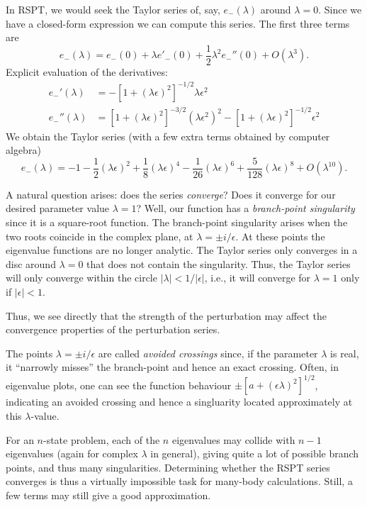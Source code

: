 \documentclass{report}
\theoremstyle{plain}
\theoremstyle{definition}
\begin{document}
In RSPT, we would seek the Taylor series of, say, $e_-(\lambda)$
around $\lambda=0$. Since we have a closed-form expression we can
compute this series. The first three terms are
\begin{equation}
  e_-(\lambda) = e_-(0) + \lambda e'_-(0) + \frac{1}{2}\lambda^2 e_-''(0)
  + O(\lambda^3).
\end{equation}
Explicit evaluation of the derivatives:
\begin{align}
  e_-'(\lambda) &= -[1 + (\lambda\epsilon)^2]^{-1/2} \lambda\epsilon^2 \\
  e_-''(\lambda) &= [1 + (\lambda\epsilon)^2]^{-3/2}
  (\lambda\epsilon^2)^2 - [1 + (\lambda\epsilon)^2]^{-1/2} \epsilon^2
\end{align}
We obtain the Taylor series (with a few extra terms obtained by
computer algebra)
\begin{equation}
  e_-(\lambda) = -1 - \frac{1}{2}(\lambda\epsilon)^2 +
  \frac{1}{8}(\lambda\epsilon)^4 - \frac{1}{26}(\lambda\epsilon)^6  +
  \frac{5}{128} (\lambda\epsilon)^8 + O(\lambda^{10}).
\end{equation}

A natural question arises: does the series \emph{converge}? Does it
converge for our desired parameter value $\lambda=1$? Well, our
function has a \emph{branch-point singularity} since it is a
square-root function.  The branch-point singularity arises when the
two roots coincide in the complex plane, at $\lambda = \pm
i/\epsilon$. At these points the eigenvalue functions are no longer
analytic. The Taylor series only converges in a disc around
$\lambda=0$ that does not contain the singularity. Thus, the Taylor
series will only converge within the circle $|\lambda|<1/|\epsilon|$,
i.e., it will converge for $\lambda=1$ only if $|\epsilon| < 1$.

Thus, we see directly that the strength of the perturbation may affect
the convergence properties of the perturbation series.

The points $\lambda = \pm i/\epsilon$ are called \emph{avoided
  crossings} since, if the parameter $\lambda$ is real, it ``narrowly
misses'' the branch-point and hence an exact crossing. Often, in
eigenvalue plots, one can see the function behaviour $\pm [a+(\epsilon
\lambda)^2]^{1/2}$, indicating an avoided crossing and hence a
singluarity located approximately at this $\lambda$-value.

For an $n$-state problem, each of the $n$ eigenvalues may collide with
$n-1$ eigenvalues (again for complex $\lambda$ in general), giving
quite a lot of possible branch points, and thus many
singularities. Determining whether the RSPT series converges is thus
a virtually impossible task for many-body calculations. Still, a few
terms may still give a good approximation.
\end{document}
